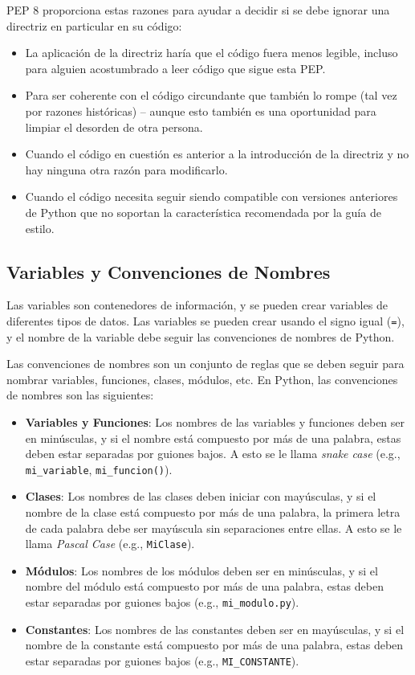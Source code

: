 \documentclass[executivepaper]{article}
\begin{document}
PEP 8 proporciona estas razones para ayudar a decidir si se debe ignorar una directriz en particular en su código:
\begin{itemize}
    \item La aplicación de la directriz haría que el código fuera menos legible, incluso para alguien acostumbrado a leer código que sigue esta PEP.
    \item Para ser coherente con el código circundante que también lo rompe (tal vez por razones históricas) -- aunque esto también es una oportunidad para limpiar el desorden de otra persona.
    \item Cuando el código en cuestión es anterior a la introducción de la directriz y no hay ninguna otra razón para modificarlo.
    \item Cuando el código necesita seguir siendo compatible con versiones anteriores de Python que no soportan la característica recomendada por la guía de estilo.
\end{itemize}

\subsection{Variables y Convenciones de Nombres}

Las variables son contenedores de información, y se pueden crear variables de diferentes tipos de datos. Las variables se pueden crear usando el signo igual (\texttt{=}), y el nombre de la variable debe seguir las convenciones de nombres de Python.

Las convenciones de nombres son un conjunto de reglas que se deben seguir para nombrar variables, funciones, clases, módulos, etc. En Python, las convenciones de nombres son las siguientes:

\begin{itemize}
    \item \textbf{Variables y Funciones}: Los nombres de las variables y funciones deben ser en minúsculas, y si el nombre está compuesto por más de una palabra, estas deben estar separadas por guiones bajos. A esto se le llama \emph{snake case} (e.g., \lstinline{mi_variable}, \lstinline{mi_funcion()}).
    
    \item \textbf{Clases}: Los nombres de las clases deben iniciar con mayúsculas, y si el nombre de la clase está compuesto por más de una palabra, la primera letra de cada palabra debe ser mayúscula sin separaciones entre ellas. A esto se le llama \emph{Pascal Case} (e.g., \lstinline{MiClase}).
    
    \item \textbf{Módulos}: Los nombres de los módulos deben ser en minúsculas, y si el nombre del módulo está compuesto por más de una palabra, estas deben estar separadas por guiones bajos (e.g., \lstinline{mi_modulo.py}).
    
    \item \textbf{Constantes}: Los nombres de las constantes deben ser en mayúsculas, y si el nombre de la constante está compuesto por más de una palabra, estas deben estar separadas por guiones bajos (e.g., \lstinline{MI_CONSTANTE}).
\end{itemize}
\end{document}
